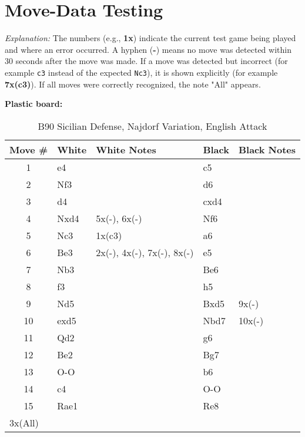 \chapter{Move-Data Testing}
\label{app:move-data-testing}


\par\scriptsize
\textit{Explanation:} The numbers (e.g., \textbf{1x}) indicate the current test game being played and where an error occurred. A hyphen (\textbf{-}) means no move was detected within 30 seconds after the move was made. If a move was detected but incorrect (for example \texttt{c3} instead of the expected \texttt{Nc3}), it is shown explicitly (for example \textbf{7x(c3)}). If all moves were correctly recognized, the note "All" appears.

\normalsize %

\begin{center}
\footnotesize  %
\textbf{Plastic board:}
\end{center}

\begin{table}[htbp]
\centering
\scriptsize
\caption{B90 Sicilian Defense, Najdorf Variation, English Attack}
\begin{tabular}{|c|l|p{5cm}|l|p{5cm}|}
\hline
\textbf{Move \#} & \textbf{White} & \textbf{White Notes} & \textbf{Black} & \textbf{Black Notes} \\
\hline
1  & e4    &                     & c5    &                        \\
2  & Nf3   &                     & d6    &                        \\
3  & d4    &                     & cxd4  &                        \\
4  & Nxd4  & 5x(-), 6x(-)        & Nf6   &                        \\
5  & Nc3   & 1x(c3)              & a6    &                        \\
6  & Be3   & 2x(-), 4x(-), 7x(-), 8x(-) & e5    &                        \\
7  & Nb3   &                     & Be6   &                        \\
8  & f3    &                     & h5    &                        \\
9  & Nd5   &                     & Bxd5  & 9x(-)                  \\
10 & exd5  &                     & Nbd7  & 10x(-)                 \\
11 & Qd2   &                     & g6    &                        \\
12 & Be2   &                     & Bg7   &                        \\
13 & O-O   &                     & b6    &                        \\
14 & c4    &                     & O-O   &                        \\
15 & Rae1  &                     & Re8   &                        \\
\hline
\multicolumn{5}{|l|}{3x(All)} \\
\hline
\end{tabular}
\end{table}

